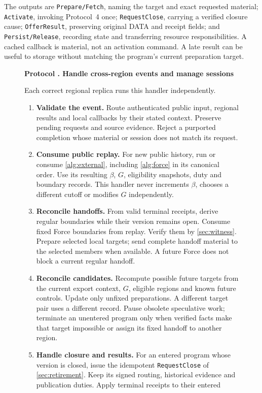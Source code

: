 \documentclass[11pt,a4paper]{article}
\newcounter{protocol}
\newenvironment{protocol}[3][htbp]{\begin{figure}[#1]\refstepcounter{protocol}\label{#2}
\begin{mdframed}[linewidth=.6pt,skipabove=0pt,skipbelow=0pt,
innertopmargin=7pt,innerbottommargin=7pt]\small
\textbf{Protocol \theprotocol. #3}\par\smallskip}{\end{mdframed}\end{figure}}
\begin{document}
The outputs are \texttt{Prepare/Fetch}, naming the target and exact
requested material; \texttt{Activate}, invoking Protocol~4 once;
\texttt{RequestClose}, carrying a verified closure cause;
\texttt{OfferResult}, preserving original DATA and receipt fields;
and \texttt{Persist/Release}, recording state and transferring resource
responsibilities. A cached callback is material, not an activation
command. A late result can be useful to storage without matching the
program's current preparation target.

\begin{protocol}[H]{alg:rotation}{Handle cross-region events and manage sessions}
Each correct regional replica runs this handler independently.
\begin{enumerate}[label=\textbf{\arabic*)},itemsep=3pt]
\item \textbf{Validate the event.} Route authenticated public input,
regional results and local callbacks by their stated context. Preserve
pending requests and source evidence. Reject a purported completion
whose material or session does not match its request.
\item \textbf{Consume public replay.} For new public history, run or
consume \cref{alg:external}, including \cref{alg:force} in its canonical
order. Use its resulting $\beta$, $G$, eligibility snapshots, duty and
boundary records. This handler never increments $\beta$, chooses a
different cutoff or modifies $G$ independently.
\item \textbf{Reconcile handoffs.} From valid terminal receipts,
derive regular boundaries while their version remains open. Consume
fixed Force boundaries from replay. Verify them by
\cref{sec:witness}. Prepare selected local targets; send complete
handoff material to the selected members when available. A future
Force does not block a current regular handoff.
\item \textbf{Reconcile candidates.} Recompute possible future
targets from the current export context, $G$, eligible regions and
known future controls. Update only unfixed preparations. A different
target pair uses a different record. Pause obsolete speculative work;
terminate an unentered program only when verified facts make that
target impossible or assign its fixed handoff to another region.
\item \textbf{Handle closure and results.} For an entered program
whose version is closed, issue the idempotent \texttt{RequestClose}
of \cref{sec:retirement}. Keep its signed routing, historical evidence
and publication duties. Apply terminal receipts to their entered

\end{enumerate}
\end{protocol}
\end{document}
